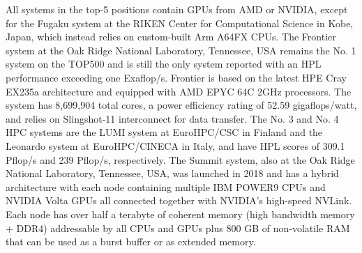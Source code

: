 \par
All systems in the top-5 positions contain GPUs from AMD or NVIDIA, except for the Fugaku system at the RIKEN Center for Computational Science in Kobe, Japan, which instead relies on custom-built Arm A64FX CPUs.
The Frontier system at the Oak Ridge National Laboratory, Tennessee, USA remains the No. 1 system on the TOP500 and is still the only system reported with an HPL performance exceeding one Exaflop/s.
Frontier is based on the latest HPE Cray EX235a architecture and equipped with AMD EPYC 64C 2GHz processors. The system has 8,699,904 total cores, a power efficiency rating of 52.59 gigaflops/watt, and relies on Slingshot-11 interconnect for data transfer.  
The No. 3 and No. 4 HPC systems are the LUMI system at EuroHPC/CSC in Finland and the Leonardo system at EuroHPC/CINECA in Italy, and have HPL scores of 309.1 Pflop/s and 239 Pflop/s, respectively.
The Summit system, also at the Oak Ridge National Laboratory, Tennessee, USA, was launched in 2018 and has a hybrid architecture with each node containing multiple IBM POWER9 CPUs and NVIDIA Volta GPUs all connected together with NVIDIA’s high-speed NVLink.
Each node has over half a terabyte of coherent memory (high bandwidth memory + DDR4) addressable by all CPUs and GPUs plus 800 GB of non-volatile RAM that can be used as a burst buffer or as extended memory.

